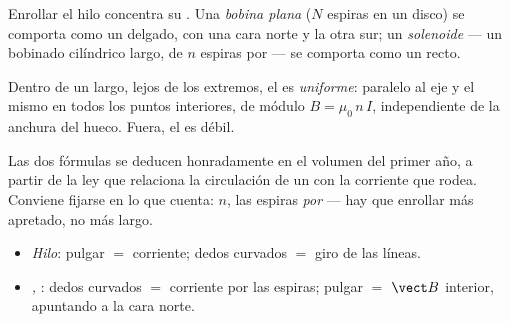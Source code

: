\begin{definition}\label{def:g11:magnetic-fields:solenoid}
Enrollar el hilo concentra su . Una \emph{bobina
plana} ($N$ espiras en un disco) se comporta como un 
delgado, con una cara norte y la otra sur; un
\emph{solenoide} --- un bobinado cilíndrico largo, de
$n$ espiras por  --- se comporta como un  recto.
\end{definition}

\begin{proposition}\label{prop:g11:magnetic-fields:solenoidfield}
Dentro de un  largo, lejos de los extremos, el  es
\emph{uniforme}: paralelo al eje y el mismo en todos los puntos
interiores, de módulo $B = \mu_0\, n\, I$, independiente de la anchura
del hueco. Fuera, el  es débil.
\end{proposition}
\admitted

\begin{remark}
Las dos fórmulas se deducen honradamente en el volumen del primer año, a
partir de la ley que relaciona la circulación de un  con la
corriente que rodea. Conviene fijarse en lo que cuenta: $n$, las espiras
\emph{por } --- hay que enrollar más apretado, no más largo.
\end{remark}

\begin{method}\label{met:g11:magnetic-fields:righthand}
\begin{itemize}
  \item \emph{Hilo}: pulgar $=$ corriente; dedos curvados $=$ giro de
        las líneas.
  \item \emph{, }: dedos curvados $=$ corriente por las
        espiras; pulgar $=$ $\vect B$ interior, apuntando a la cara
        norte.
\end{itemize}
\end{method}

